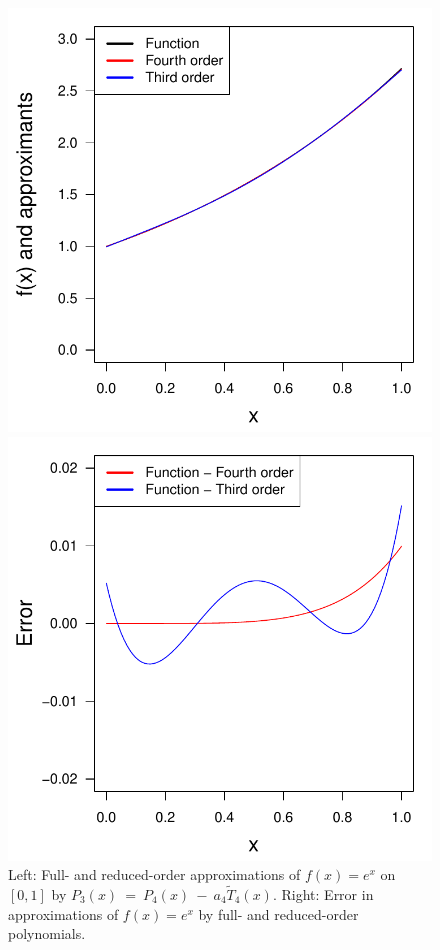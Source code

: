 \documentclass[11pt]{article}
\begin{document}
\begin{figure}[h!]\centering
\begin{minipage}{0.48\textwidth}
\includegraphics[width=\textwidth]{cheb_order_lagr.pdf}

\end{minipage}
\begin{minipage}{0.48\textwidth}

\includegraphics[width=\textwidth]{cheb_order_lagr_err.pdf}
\end{minipage}
\caption{Left: Full- and reduced-order approximations of \(f(x) = e^x\) on \([0, 1]\) by \(P_3(x)~=~P_4(x)~-~a_4 \tilde T_4(x)\). Right: Error in approximations of \(f(x) = e^x\) by full- and reduced-order polynomials.}\label{fig::cheb_ord}
\end{figure}
\end{document}
